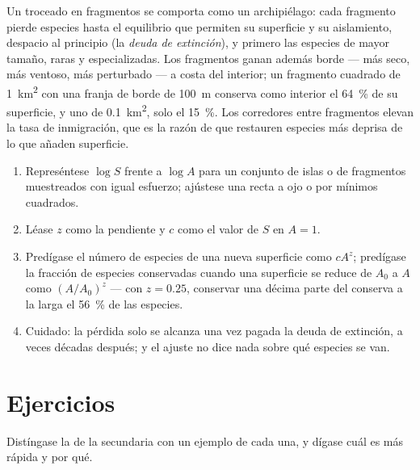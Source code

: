 \begin{proposition}[Fragmentación]\label{prop:b1:ecosystem-dynamics:fragmentation}
Un  troceado en fragmentos se comporta como un archipiélago: cada
fragmento pierde especies hasta el equilibrio que permiten su superficie y
su aislamiento, despacio al principio (la \emph{deuda de extinción}), y
primero las especies de mayor tamaño, raras y especializadas. Los fragmentos
ganan además borde --- más seco, más ventoso, más perturbado --- a costa del
interior; un fragmento cuadrado de \qty{1}{km^2} con una franja de borde de
\qty{100}{m} conserva como interior el \qty{64}{\%} de su superficie, y uno
de \qty{0.1}{km^2}, solo el \qty{15}{\%}. Los corredores entre fragmentos
elevan la tasa de inmigración, que es la razón de que restauren especies más
deprisa de lo que añaden superficie.
\end{proposition}

\begin{method}\label{met:b1:ecosystem-dynamics:sar}
\begin{enumerate}
  \item Represéntese $\log S$ frente a $\log A$ para un conjunto de islas o
        de fragmentos muestreados con igual esfuerzo; ajústese una recta a
        ojo o por mínimos cuadrados.
  \item Léase $z$ como la pendiente y $c$ como el valor de $S$ en $A = 1$.
  \item Predígase el número de especies de una nueva superficie como $cA^z$;
        predígase la fracción de especies conservadas cuando una superficie
        se reduce de $A_0$ a $A$ como $(A/A_0)^z$ --- con $z = 0.25$,
        conservar una décima parte del  conserva a la larga el
        \qty{56}{\%} de las especies.
  \item Cuidado: la pérdida solo se alcanza una vez pagada la deuda de
        extinción, a veces décadas después; y el ajuste no dice nada sobre
        qué especies se van.
\end{enumerate}
\end{method}

\section{Ejercicios}

\begin{exercise}[$\star$]\label{exo:b1:ecosystem-dynamics:1}
Distíngase la  de la secundaria con un ejemplo de cada una,
y dígase cuál es más rápida y por qué.
\end{exercise}

